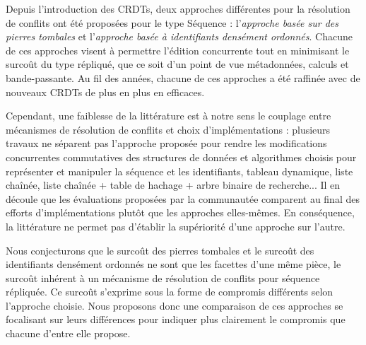 \label{sec:seq-crdts-synth}

Depuis l'introduction des \acp{CRDT}, deux approches différentes pour la résolution de conflits ont été proposées pour le type Séquence : l'\emph{approche basée sur des pierres tombales} et l'\emph{approche basée à identifiants densément ordonnés}.
Chacune de ces approches visent à permettre l'édition concurrente tout en minimisant le surcoût du type répliqué, que ce soit d'un point de vue métadonnées, calculs et bande-passante.
Au fil des années, chacune de ces approches a été raffinée avec de nouveaux \acp{CRDT} de plus en plus en efficaces.

Cependant, une faiblesse de la littérature est à notre sens le couplage entre mécanismes de résolution de conflits et choix d'implémentations : plusieurs travaux \cite{2009-treedoc-preguica, 2009-logoot-weiss, 2013-logootsplit,briot:hal-01343941} ne séparent pas l'approche proposée pour rendre les modifications concurrentes commutatives des structures de données et algorithmes choisis pour représenter et manipuler la séquence et les identifiants, \eg tableau dynamique, liste chaînée, liste chaînée + table de hachage + arbre binaire de recherche...
Il en découle que les évaluations proposées par la communautée comparent au final des efforts d'implémentations plutôt que les approches elles-mêmes.
En conséquence, la littérature ne permet pas d'établir la supériorité d'une approche sur l'autre.

Nous conjecturons que le surcoût des pierres tombales et le surcoût des identifiants densément ordonnés ne sont que les facettes d'une même pièce, \ie le surcoût inhérent à un mécanisme de résolution de conflits pour séquence répliquée.
Ce surcoût s'exprime sous la forme de compromis différents selon l'approche choisie.
Nous proposons donc une comparaison de ces approches se focalisant sur leurs différences pour indiquer plus clairement le compromis que chacune d'entre elle propose.

